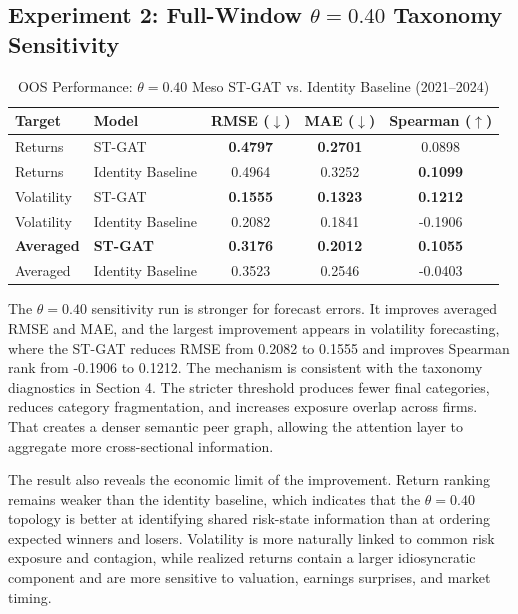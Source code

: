 \documentclass[11pt, a4paper]{article}
\begin{document}
\subsection{Experiment 2: Full-Window \texorpdfstring{$\theta=0.40$}{theta=0.40} Taxonomy Sensitivity}
\begin{table}[H]
\centering
\caption{OOS Performance: $\theta=0.40$ Meso ST-GAT vs. Identity Baseline (2021--2024)}
\label{tab:theta040_meso_results}
\vspace{0.2cm}
\renewcommand{\arraystretch}{1.25}
\begin{tabular}{llccc}
\toprule
\textbf{Target} & \textbf{Model} & \textbf{RMSE} ($\downarrow$) & \textbf{MAE} ($\downarrow$) & \textbf{Spearman} ($\uparrow$) \\
\midrule
Returns & ST-GAT & \textbf{0.4797} & \textbf{0.2701} & 0.0898 \\
Returns & Identity Baseline & 0.4964 & 0.3252 & \textbf{0.1099} \\
\midrule
Volatility & ST-GAT & \textbf{0.1555} & \textbf{0.1323} & \textbf{0.1212} \\
Volatility & Identity Baseline & 0.2082 & 0.1841 & -0.1906 \\
\midrule
\textbf{Averaged} & \textbf{ST-GAT} & \textbf{0.3176} & \textbf{0.2012} & \textbf{0.1055} \\
Averaged & Identity Baseline & 0.3523 & 0.2546 & -0.0403 \\
\bottomrule
\end{tabular}
\end{table}

The $\theta=0.40$ sensitivity run is stronger for forecast errors. It improves averaged RMSE and MAE, and the largest improvement appears in volatility forecasting, where the ST-GAT reduces RMSE from 0.2082 to 0.1555 and improves Spearman rank from -0.1906 to 0.1212. The mechanism is consistent with the taxonomy diagnostics in Section 4. The stricter threshold produces fewer final categories, reduces category fragmentation, and increases exposure overlap across firms. That creates a denser semantic peer graph, allowing the attention layer to aggregate more cross-sectional information.

The result also reveals the economic limit of the improvement. Return ranking remains weaker than the identity baseline, which indicates that the $\theta=0.40$ topology is better at identifying shared risk-state information than at ordering expected winners and losers. Volatility is more naturally linked to common risk exposure and contagion, while realized returns contain a larger idiosyncratic component and are more sensitive to valuation, earnings surprises, and market timing.
\end{document}
